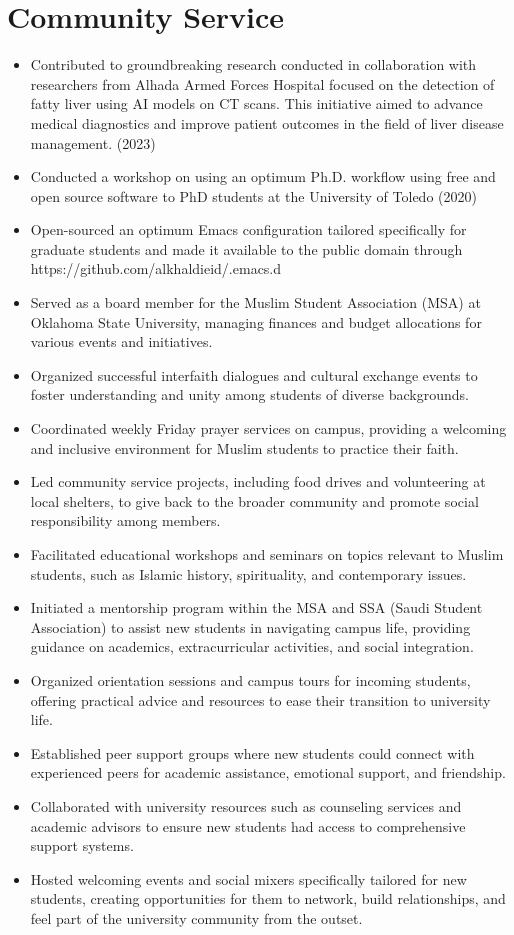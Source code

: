 \documentclass[letterpaper,
		10pt]{article}
\begin{document}
\section{Community Service}
\begin{itemize}
\item Contributed to groundbreaking research conducted in collaboration with researchers from Alhada Armed Forces Hospital focused on the detection of fatty liver using AI models on CT scans. This initiative aimed to advance medical diagnostics and improve patient outcomes in the field of liver disease management. (2023)
\item Conducted a workshop on using an optimum Ph.D. workflow using free and open source software to PhD students at the University of Toledo (2020) 
\item Open-sourced an optimum Emacs configuration tailored specifically for graduate students and made it available to the public domain through https://github.com/alkhaldieid/.emacs.d
\item Served as a board member for the Muslim Student Association (MSA) at Oklahoma State University, managing finances and budget allocations for various events and initiatives.
\item Organized successful interfaith dialogues and cultural exchange events to foster understanding and unity among students of diverse backgrounds.
\item Coordinated weekly Friday prayer services on campus, providing a welcoming and inclusive environment for Muslim students to practice their faith.
\item Led community service projects, including food drives and volunteering at local shelters, to give back to the broader community and promote social responsibility among members.
\item Facilitated educational workshops and seminars on topics relevant to Muslim students, such as Islamic history, spirituality, and contemporary issues.
\item Initiated a mentorship program within the MSA and SSA (Saudi Student Association) to assist new students in navigating campus life, providing guidance on academics, extracurricular activities, and social integration.
\item Organized orientation sessions and campus tours for incoming students, offering practical advice and resources to ease their transition to university life.
\item Established peer support groups where new students could connect with experienced peers for academic assistance, emotional support, and friendship.
\item Collaborated with university resources such as counseling services and academic advisors to ensure new students had access to comprehensive support systems.
\item Hosted welcoming events and social mixers specifically tailored for new students, creating opportunities for them to network, build relationships, and feel part of the university community from the outset.
\end{itemize}
\end{document}
